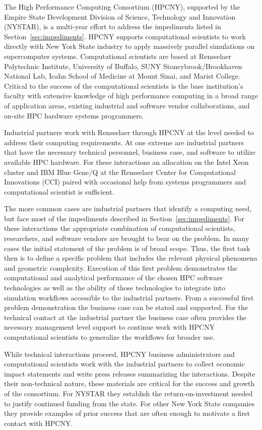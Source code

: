 The High Performance Computing Consortium (HPCNY), supported by
the Empire State Development Division of Science, Technology and Innovation
(NYSTAR), is a multi-year effort to address the impediments listed in
Section~\ref{sec:impediments}.
HPCNY supports computational scientists to work directly with New York State
industry to apply massively parallel simulations on supercomputer systems.
Computational scientists are based at Rensselaer Polytechnic Institute,
University of Buffalo, SUNY Stoneybrook/Brookhaven National Lab, Icahn School of
Medicine at Mount Sinai, and Marist College.
Critical to the success of the computational scientists is the base
institution's faculty with extensive knowledge of high performance computing in
a broad range of application areas, existing industrial and software vendor
collaborations, and on-site HPC hardware systems programmers.

Industrial partners work with Rensselaer through HPCNY at the level needed to
address their computing requirements.
At one extreme are industrial partners that have the necessary technical
personnel, business case, and software to utilize available HPC hardware.
For these interactions an allocation on the Intel Xeon cluster and IBM
Blue Gene/Q at the Rensselaer Center for Computational Innovations (CCI) paired
with occasional help from systems programmers and computational scientist is
sufficient.

The more common cases are industrial partners that identify a computing need,
but face most of the impediments described in Section~\ref{sec:impediments}.
For these interactions the appropriate combination of computational scientists,
researchers, and software vendors are brought to bear on the problem.
In many cases the initial statement of the problem is of broad scope.
Thus, the first task then is to define a specific problem that includes the
relevant physical phenomena and geometric complexity.
Execution of this first problem demonstrates the computational and analytical
performance of the chosen HPC software technologies as well as the ability of
those technologies to integrate into simulation workflows accessible to the
industrial partners.
From a successful first problem demonstration the business case can be stated
and supported.
For the technical contact at the industrial partner the business case often
provides the necessary management level support to continue work with HPCNY
computational scientists to generalize the workflows for broader use.

While technical interactions proceed, HPCNY business administrators and
computational scientists work with the industrial partners to collect
economic impact statements and write press releases summarizing the
interactions.
Despite their non-technical nature, these materials are critical for the success
and growth of the consortium.
For NYSTAR they establish the return-on-investment needed to justify continued
funding from the state.
For other New York State companies they provide examples of prior success that
are often enough to motivate a first contact with HPCNY.

